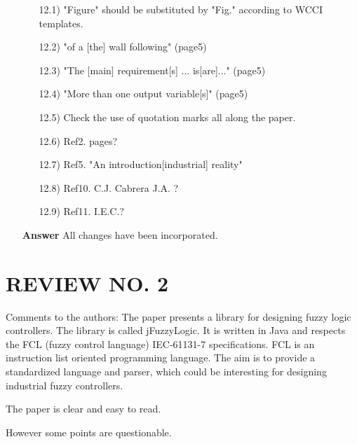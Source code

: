 \documentclass[10pt,a4paper]{article}
\begin{document}
\begin{itemize}
\begin{itemize}
   \item[12.1)] "Figure" should be substituted by "Fig." according to WCCI templates.

   \item[12.2)] "of a [the] wall following" (page5)

   \item[12.3)] "The [main] requirement[s] ... is[are]..." (page5)

   \item[12.4)] "More than one output variable[s]" (page5)

   \item[12.5)] Check the use of quotation marks all along the paper.

   \item[12.6)] Ref2. pages?

   \item[12.7)] Ref5. "An introduction[industrial] reality"

   \item[12.8)] Ref10. C.J. Cabrera J.A. ?

   \item[12.9)] Ref11. I.E.C.?
\end{itemize}

   \item[\textbf{Answer}] All changes have been incorporated.

\end{itemize}



\section{REVIEW NO. 2}

Comments to the authors:
   The paper presents a library for designing fuzzy logic controllers. The library
   is called jFuzzyLogic. It is written in Java and respects the FCL (fuzzy control
   language) IEC-61131-7 specifications. FCL is an instruction list oriented
   programming language.
   The aim is to provide a standardized language and parser, which could be
   interesting for designing industrial fuzzy controllers.

   The paper is clear and easy to read.

    However some points are questionable.
    
\end{document}

